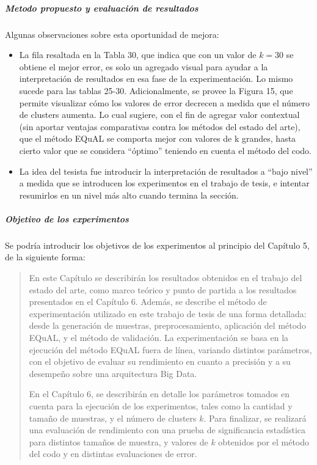 \subparagraph{Metodo propuesto y evaluación de resultados}
Algunas observaciones sobre esta oportunidad de mejora:
\begin{itemize}
	\item La fila resaltada en la Tabla 30, que indica que con un valor de \(k=30\) se obtiene el mejor error, es solo un agregado visual para ayudar a la interpretación de resultados en esa fase de la experimentación. Lo mismo sucede para las tablas 25-30. Adicionalmente, se provee la Figura 15, que permite visualizar cómo los valores de error decrecen a medida que el número de clusters aumenta. Lo cual sugiere, con el fin de agregar valor contextual (sin aportar ventajas comparativas contra los métodos del estado del arte), que el método EQuAL se comporta mejor con valores de k grandes, hasta cierto valor que se considera ``óptimo'' teniendo en cuenta el método del codo.
	\item La idea del tesista fue introducir la interpretación de resultados a ``bajo nivel'' a medida que se introducen los experimentos en el trabajo de tesis, e intentar resumirlos en un nivel más alto cuando termina la sección.
\end{itemize}

\subparagraph{Objetivo de los experimentos}
Se podría introducir los objetivos de los experimentos al principio del Capítulo 5, de la siguiente forma:

\begin{quotation}
En este Capítulo se describirán los resultados obtenidos en el trabajo del estado del arte, como marco teórico y punto de partida a los resultados presentados en el Capítulo 6. Además, se describe el método de experimentación utilizado en este trabajo de tesis de una forma detallada: desde la generación de muestras, preprocesamiento, aplicación del método EQuAL, y el método de validación. La experimentación se basa en la ejecución del método EQuAL fuera de línea, variando distintos parámetros, con el objetivo de evaluar su rendimiento en cuanto a precisión y a su desempeño sobre una arquitectura Big Data.

\bigskip

En el Capítulo 6, se describirán en detalle los parámetros tomados en cuenta para la ejecución de los experimentos, tales como la cantidad y tamaño de muestras, y el número de clusters \(k\). Para finalizar, se realizará una evaluación de rendimiento con una prueba de significancia estadística para distintos tamaños de muestra, y valores de \(k\) obtenidos por el método del codo y en distintas evaluaciones de error.
\end{quotation}

